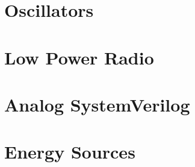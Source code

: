 \documentclass[11pt,twoside,openright]{book}
\begin{document}
\chapter{Oscillators}


\chapter{Low Power Radio}


\chapter{Analog SystemVerilog}


\chapter{Energy Sources}


%


%


\backmatter
\end{document}

